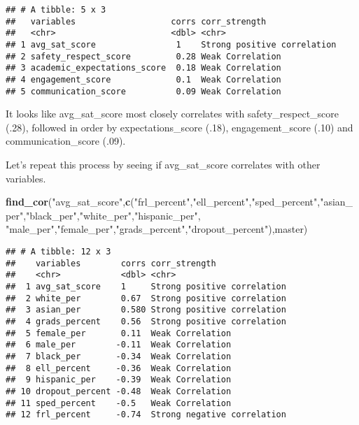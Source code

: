 \documentclass[]{article}
\newenvironment{Shaded}{\begin{snugshade}}{\end{snugshade}}
\newcommand{\KeywordTok}[1]{\textcolor[rgb]{0.13,0.29,0.53}{\textbf{#1}}}
\newcommand{\NormalTok}[1]{#1}
\newcommand{\StringTok}[1]{\textcolor[rgb]{0.31,0.60,0.02}{#1}}
\begin{document}
\begin{verbatim}
## # A tibble: 5 x 3
##   variables                   corrs corr_strength              
##   <chr>                       <dbl> <chr>                      
## 1 avg_sat_score                1    Strong positive correlation
## 2 safety_respect_score         0.28 Weak Correlation           
## 3 academic_expectations_score  0.18 Weak Correlation           
## 4 engagement_score             0.1  Weak Correlation           
## 5 communication_score          0.09 Weak Correlation
\end{verbatim}

It looks like avg\_sat\_score most closely correlates with
safety\_respect\_score (.28), followed in order by expectations\_score
(.18), engagement\_score (.10) and communication\_score (.09).

Let's repeat this process by seeing if avg\_sat\_score correlates with
other variables.

\begin{Shaded}
\begin{Highlighting}[]
\KeywordTok{find_cor}\NormalTok{(}\StringTok{"avg_sat_score"}\NormalTok{,}\KeywordTok{c}\NormalTok{(}\StringTok{"frl_percent"}\NormalTok{,}\StringTok{"ell_percent"}\NormalTok{,}\StringTok{"sped_percent"}\NormalTok{,}\StringTok{"asian_per"}\NormalTok{,}\StringTok{"black_per"}\NormalTok{,}\StringTok{"white_per"}\NormalTok{,}\StringTok{"hispanic_per"}\NormalTok{,}
                           \StringTok{"male_per"}\NormalTok{,}\StringTok{"female_per"}\NormalTok{,}\StringTok{"grads_percent"}\NormalTok{,}\StringTok{"dropout_percent"}\NormalTok{),master)}
\end{Highlighting}
\end{Shaded}

\begin{verbatim}
## # A tibble: 12 x 3
##    variables        corrs corr_strength              
##    <chr>            <dbl> <chr>                      
##  1 avg_sat_score    1     Strong positive correlation
##  2 white_per        0.67  Strong positive correlation
##  3 asian_per        0.580 Strong positive correlation
##  4 grads_percent    0.56  Strong positive correlation
##  5 female_per       0.11  Weak Correlation           
##  6 male_per        -0.11  Weak Correlation           
##  7 black_per       -0.34  Weak Correlation           
##  8 ell_percent     -0.36  Weak Correlation           
##  9 hispanic_per    -0.39  Weak Correlation           
## 10 dropout_percent -0.48  Weak Correlation           
## 11 sped_percent    -0.5   Weak Correlation           
## 12 frl_percent     -0.74  Strong negative correlation
\end{verbatim}
\end{document}

